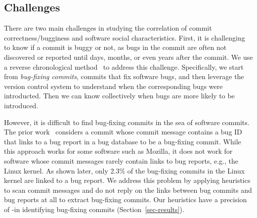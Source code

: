\subsection{Challenges}
There are two main challenges in studying the correlation of commit correctness/bugginess and software social characteristics.
First, it is challenging to know if a commit is buggy or not,
as bugs in the commit are often not 
discovered or reported until days, months, or even years after the commit. 
We use a reverse chronological method~\cite{sliwerski-msr-2005} to address this challenge. 
Specifically, we start from {\em bug-fixing commits}, commits that fix software bugs, 
and then leverage the version control system to understand when the corresponding bugs were introducted. 
Then we can know collectively when bugs are more likely to be introduced. 

However, it is difficult to find bug-fixing commits in the sea of software commits.
The prior work~\cite{sliwerski-msr-2005} considers a commit whose commit message contains a bug 
ID that links to a bug report in a bug database to be a bug-fixing commit. While this
approach works for some software such as Mozilla, it does not work for software whose commit messages
rarely contain links to bug reports, e.g., the Linux kernel.
As shown later, only 2.3\% of the bug-fixing commits in the Linux kernel are linked to a bug report.
We address this problem by applying heuristics 
to scan commit messages and do not reply on the links between bug commits and bug reports at all to extract bug-fixing commits.
Our heuristics have a precision of \postP-\linuxP in identifying bug-fixing commits (Section~\ref{sec-results}).


